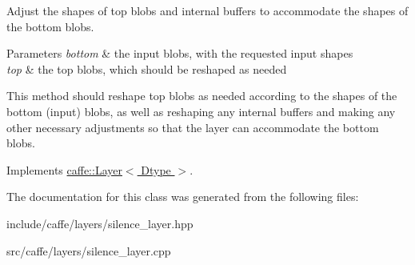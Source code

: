 Adjust the shapes of top blobs and internal buffers to accommodate the shapes of the bottom blobs. 


\begin{DoxyParams}{Parameters}
{\em bottom} & the input blobs, with the requested input shapes \\
\hline
{\em top} & the top blobs, which should be reshaped as needed\\
\hline
\end{DoxyParams}
This method should reshape top blobs as needed according to the shapes of the bottom (input) blobs, as well as reshaping any internal buffers and making any other necessary adjustments so that the layer can accommodate the bottom blobs. 

Implements \hyperlink{classcaffe_1_1Layer_ad9d391b972c769c0ebee34ca6d1c973e}{caffe\+::\+Layer$<$ Dtype $>$}.



The documentation for this class was generated from the following files\+:\begin{DoxyCompactItemize}
\item 
include/caffe/layers/silence\+\_\+layer.\+hpp\item 
src/caffe/layers/silence\+\_\+layer.\+cpp\end{DoxyCompactItemize}

